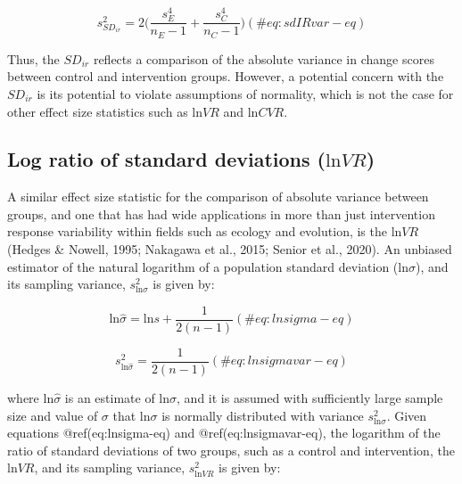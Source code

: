 \documentclass[
]{article}
\begin{document}
\begin{equation}
s^2_{SD_{ir}}=2\biggl(\frac{s^4_{E}}{n_{E}-1}+\frac{s^4_{C}}{n_{C}-1}\biggl)
(\#eq:sdIRvar-eq)
\end{equation}

Thus, the \(SD_{ir}\) reflects a comparison of the absolute variance in change scores between control and intervention groups. However, a potential concern with the \(SD_{ir}\) is its potential to violate assumptions of normality, which is not the case for other effect size statistics such as \(\textrm{ln}VR\) and \(\textrm{ln}CVR\).

\hypertarget{log-ratio-of-standard-deviations-textrmlnvr}{%
\subsection{\texorpdfstring{Log ratio of standard deviations (\(\textrm{ln}VR\))}{Log ratio of standard deviations (\textbackslash textrm\{ln\}VR)}}\label{log-ratio-of-standard-deviations-textrmlnvr}}

A similar effect size statistic for the comparison of absolute variance between groups, and one that has had wide applications in more than just intervention response variability within fields such as ecology and evolution, is the \(\textrm{ln}VR\) (Hedges \& Nowell, 1995; Nakagawa et al., 2015; Senior et al., 2020). An unbiased estimator of the natural logarithm of a population standard deviation (\(\textrm{ln}\sigma\)), and its sampling variance, \(s^2_{\textrm{ln}\sigma}\) is given by:

\begin{equation}
\textrm{ln}\hat\sigma=\textrm{ln}s+\frac{1}{2(n-1)}
(\#eq:lnsigma-eq)
\end{equation}

\begin{equation}
s^2_{\textrm{ln}\hat\sigma}=\frac{1}{2(n-1)}
(\#eq:lnsigmavar-eq)
\end{equation}

where \(\textrm{ln}\hat\sigma\) is an estimate of \(\textrm{ln}\sigma\), and it is assumed with sufficiently large sample size and value of \(\sigma\) that \(\textrm{ln}\sigma\) is normally distributed with variance \(s^2_{\textrm{ln}\sigma}\). Given equations @ref(eq:lnsigma-eq) and @ref(eq:lnsigmavar-eq), the logarithm of the ratio of standard deviations of two groups, such as a control and intervention, the \(\textrm{ln}VR\), and its sampling variance, \(s^2_{\textrm{ln}VR}\) is given by:
\end{document}
